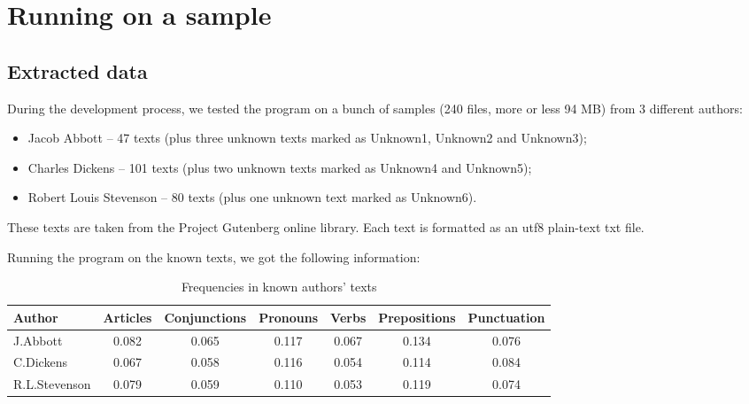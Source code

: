 \documentclass[a4paper,11pt, twoside]{article}
\begin{document}
	\newpage
	\section{Running on a sample}\label{sample}
	\subsection{Extracted data}
	During the development process, we tested the program on a bunch of samples (240 files, more or less 94 MB) from 3 different authors: 
	\begin{itemize}
		\item Jacob Abbott -- 47 texts (plus three unknown texts marked as Unknown1, Unknown2 and Unknown3);
		\item Charles Dickens -- 101 texts (plus two unknown texts marked as Unknown4 and Unknown5);
		\item Robert Louis Stevenson -- 80 texts (plus one unknown text marked as Unknown6).
	\end{itemize}

		\noindent
		These texts are taken from the Project Gutenberg online library. Each text is formatted as an utf8 plain-text txt file.

		\bigskip

		\noindent
		Running the program on the known texts, we got the following information:
		\begin{table}[h!]
			\small
			\begin{tabular}{lcccccc}
				\toprule
				Author   & Articles    & Conjunctions & Pronouns & Verbs & Prepositions & Punctuation \\
				\midrule
				J.Abbott      & 0.082  & 0.065 & 0.117 & 0.067 & 0.134 & 0.076  \\
				C.Dickens     & 0.067  & 0.058 & 0.116 & 0.054 & 0.114 & 0.084  \\
				R.L.Stevenson & 0.079  & 0.059 & 0.110 & 0.053 & 0.119 & 0.074  \\
				\bottomrule
			\end{tabular}
			\caption{Frequencies in known authors' texts}
			\label{tab:known-freq}
		\end{table}
		\bigskip
\end{document}
